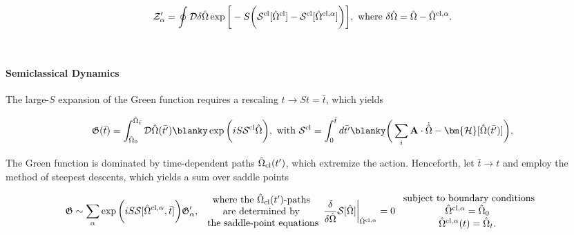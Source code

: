 \begin{equation}
    \mathcal{Z}'_{\alpha} = \oint \mathcal{D}\delta \hat{\Omega} \exp\bigg[ -S \bigg(\mathcal{S}^{\textnormal{cl}}[\hat{\Omega}^{\textnormal{cl}}] - \mathcal{S}^{\textnormal{cl}}[\hat{\Omega}^{\textnormal{cl}, \alpha}] \bigg) \bigg], \textnormal{ where } \delta \hat{\Omega} = \hat{\Omega} - \hat{\Omega}^{\textnormal{cl}, \alpha}. 
\end{equation}

\blanky \\

\paragraph{Semiclassical Dynamics}

The large-$S$ expansion of the Green function requires a rescaling $t \rightarrow St = \bar{t}$, which yields

\begin{equation}
        \mathfrak{G}(\bar{t}) = \int_{\hat{\Omega}_0}^{\hat{\Omega}_{\bar{t}}} \mathcal{D} {\hat{\Omega}}(\bar{t'}) \blanky \exp \bigg(i S \mathcal{S}^{\textnormal{cl}} {\hat{\Omega}}\bigg), \textnormal{ with } \mathcal{S}^{\textnormal{cl}} = \int_{0}^{\bar{t}} d\bar{t'} \blanky \bigg(\sum_{i} {\bf A} \cdot \dot{\hat{\Omega}} - \bm{\mathcal{H}}[{\hat{\Omega}}(\bar{t'})]\bigg),
\end{equation}

The Green function is dominated by time-dependent paths $\hat{\Omega}_{\textnormal{cl}}(t')$, which extremize the action. Henceforth, let $\bar{t} \rightarrow t$ and employ the method of steepest descents, which yields a sum over saddle points 

\begin{equation}
    \mathfrak{G} \sim \sum_{\alpha} \exp \bigg(i S \mathcal{S}[\hat{\Omega}^{\textnormal{cl}, \alpha}, \bar{t}]\bigg) \mathfrak{G}'_{\alpha}, \begin{array}{cc}
         \textnormal{ where the $\hat{\Omega}_{\textnormal{cl}}(t')$-paths } \\
         \textnormal{ are determined by } \\
         \textnormal{ the saddle-point equations} 
    \end{array} \frac{\delta}{\delta \hat{\Omega}} \mathcal{S}[\hat{\Omega}]\bigg|_{\hat{\Omega}^{\textnormal{cl}, \alpha}} = 0 \begin{array}{cc}
         \textnormal{ subject to boundary conditions}  \\
         \hat{\Omega}^{\textnormal{cl}, \alpha} = \hat{\Omega}_0 \\
         \hat{\Omega}^{\textnormal{cl}, \alpha}(t) = \hat{\Omega}_t.
    \end{array}
\end{equation}

